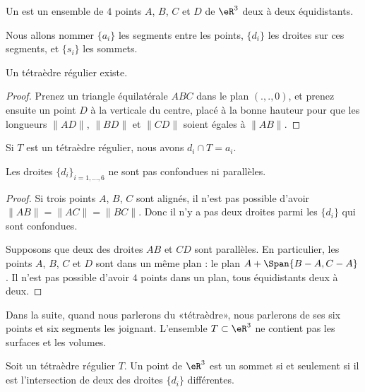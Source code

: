 \begin{definition}   \label{DEFooMUUMooFVxKyb}
    Un  est un ensemble de \( 4\) points \( A\), \( B\), \( C\) et \( D\) de \( \eR^3\) deux à deux équidistants.

    Nous allons nommer \( \{ a_i \}\) les segments entre les points, \( \{ d_i \}\) les droites sur ces segments, et \( \{ s_i \}\) les sommets.
\end{definition}

\begin{lemma}
    Un tétraèdre régulier existe.
\end{lemma}

\begin{proof}
    Prenez un triangle équilatérale \( ABC\) dans le plan \( (.,.,0)\), et prenez ensuite un point \( D\) à la verticale du centre, placé à la bonne hauteur pour que les longueurs \( \| AD \|\), \( \| BD \|\) et \( \| CD \|\) soient égales à \( \| AB \|\).
\end{proof}

\begin{lemma}       \label{LEMooNWELooZeSEMN}
    Si \( T\) est un tétraèdre régulier, nous avons \( d_i\cap T=a_i\).
\end{lemma}

\begin{lemma}       \label{LEMooUSKVooQJiBuz}
    Les droites \( \{ d_i \}_{i=1,\ldots, 6}\) ne sont pas confondues ni parallèles.
\end{lemma}

\begin{proof}
    Si trois points \( A\), \( B\), \( C\) sont alignés, il n'est pas possible d'avoir \( \| AB \|=\| AC \|=\| BC \|\). Donc il n'y a pas deux droites parmi les \( \{ d_i \}\) qui sont confondues.

    Supposons que deux des droites \( AB\) et \( CD\) sont parallèles. En particulier, les points \( A\), \( B\), \( C\) et \( D\) sont dans un même plan : le plan \( A+\Span\{ B-A, C-A \}\). Il n'est pas possible d'avoir \( 4\) points dans un plan, tous équidistants deux à deux. 
\end{proof}

Dans la suite, quand nous parlerons du «tétraèdre», nous parlerons de ses six points et six segments les joignant. L'ensemble \( T\subset \eR^3\) ne contient pas les surfaces et les volumes.

\begin{lemma}   \label{LEMooJCMKooOjMqtw}
    Soit un tétraèdre régulier \( T\). Un point de \( \eR^3\) est un sommet si et seulement si il est l'intersection de deux des droites \( \{ d_i \}\) différentes.
\end{lemma}

